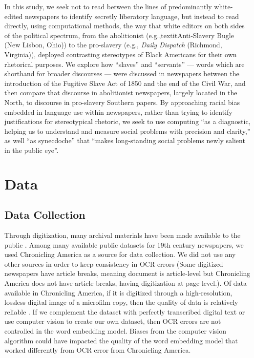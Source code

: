 \documentclass[11pt]{article}
\begin{document}
In this study, we seek not to read between the lines of predominantly white-edited newspapers to identify secretly liberatory language, but instead to read directly, using computational methods, the way that white editors on both sides of the political spectrum, from the abolitionist (e.g.,textit{Anti-Slavery Bugle} (New Lisbon, Ohio)) to the pro-slavery (e.g., \textit{Daily Dispatch} (Richmond, Virginia)), deployed contrasting stereotypes of Black Americans for their own rhetorical purposes. 
We explore how ``slaves'' and ``servants'' — words which are shorthand for broader discourses — were discussed in newspapers between the introduction of the Fugitive Slave Act of 1850 and the end of the Civil War, and then compare that discourse in abolitionist newspapers, largely located in the North, to discourse in pro-slavery Southern papers. 
By approaching racial bias embedded in language use within newspapers, rather than trying to identify justifications for stereotypical rhetoric, we seek to use computing ``as a diagnostic, helping us to understand and measure social problems with precision and clarity,'' as well ``as synecdoche'' that ``makes long-standing social problems newly salient in the public eye''\citep{abebe2020roles}.

\section{Data} \label{data}
\subsection{Data Collection} \label{data collection}

Through digitization, many archival materials have been made available to the public \cite{dobreski2020remodeling}.
Among many available public datasets for 19th century newspapers, we used Chronicling America as a source for data collection. 
We did not use any other sources in order to keep consistency in OCR errors (Some digitized newspapers have article breaks, meaning document is article-level but Chronicling America does not have article breaks, having digitization at page-level.).
Of data available in Chronicling America, if it is digitized through a high-resolution, lossless digital image of a microfilm copy, then the quality of data is relatively reliable \citep{lorang_electronic_2012}. 
If we complement the dataset with perfectly transcribed digital text or use computer vision to create our own dataset, then OCR errors are not controlled in the word embedding model. 
Biases from the computer vision algorithm could have impacted the quality of the word embedding model that worked differently from OCR error from Chronicling America. 
\end{document}
